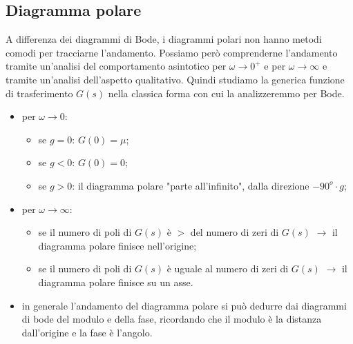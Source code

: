 \begin{landscape}
\begin{multicols*}{3}
    \subsection*{Diagramma polare}
    A differenza dei diagrammi di Bode, i diagrammi polari non hanno metodi comodi per tracciarne l'andamento. Possiamo però comprenderne l'andamento tramite un'analisi del comportamento asintotico per $\omega \rightarrow 0^+$ e per $\omega \rightarrow  \infty$ e tramite un'analisi dell'aspetto qualitativo.\newline
    \newline
    Quindi studiamo la generica funzione di trasferimento $G(s)$ nella classica forma con cui la analizzeremmo per Bode.
    \begin{itemize}
        \item per $\omega \rightarrow  0$:
        \begin{itemize}
            \item se $g=0$: $G(0) = \mu$;
            \item se $g<0$: $G(0) = 0$;
            \item se $g>0$: il diagramma polare "parte all'infinito", dalla direzione $-90^o \cdot  g$;
        \end{itemize}
        \item per $\omega \rightarrow  \infty$:
        \begin{itemize}
            \item se il numero di poli di $G(s)$ è $>$ del numero di zeri di $G(s)$ $\rightarrow $ il diagramma polare finisce nell'origine;
            \item se il numero di poli di $G(s)$ è uguale al numero di zeri di $G(s)$ $\rightarrow $ il diagramma polare finisce su un asse.
        \end{itemize}
        \item in generale l'andamento del diagramma polare si può dedurre dai diagrammi di bode del modulo e della fase, ricordando che il modulo è la distanza dall'origine e la fase è l'angolo.
    \end{itemize}

\end{multicols*}
\end{landscape}
